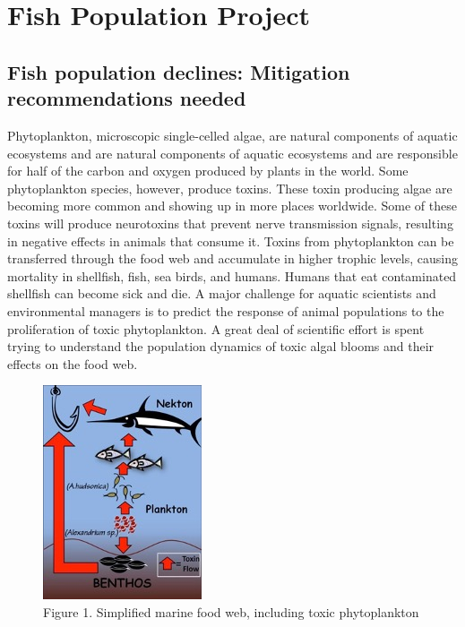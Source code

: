 \documentclass[
]{book}
\begin{document}
\hypertarget{fish-population-project}{%
\section*{Fish Population Project}\label{fish-population-project}}

\hypertarget{fish-population-declines-mitigation-recommendations-needed}{%
\subsection*{Fish population declines: Mitigation recommendations needed}\label{fish-population-declines-mitigation-recommendations-needed}}

Phytoplankton, microscopic single-celled algae, are natural components of aquatic ecosystems and are natural components of aquatic ecosystems and are responsible for half of the carbon and oxygen produced by plants in the world. Some phytoplankton species, however, produce toxins. These toxin producing algae are becoming more common and showing up in more places worldwide. Some of these toxins will produce neurotoxins that prevent nerve transmission signals, resulting in negative effects in animals that consume it. Toxins from phytoplankton can be transferred through the food web and accumulate in higher trophic levels, causing mortality in shellfish, fish, sea birds, and humans. Humans that eat contaminated shellfish can become sick and die. A major challenge for aquatic scientists and environmental managers is to predict the response of animal populations to the proliferation of toxic phytoplankton. A great deal of scientific effort is spent trying to understand the population dynamics of toxic algal blooms and their effects on the food web.

\begin{figure}
\centering
\includegraphics{images/figure1.png}
\caption{Figure 1. Simplified marine food web, including toxic phytoplankton}
\end{figure}
\end{document}
